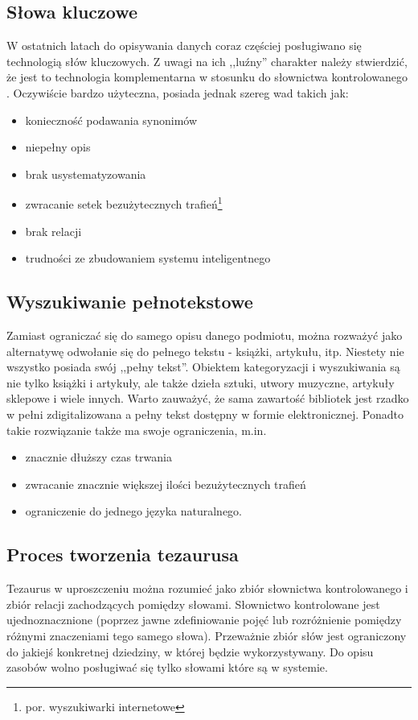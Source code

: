 \documentclass[12pt,a4paper,notitlepage]{article}
\begin{document}
\subsection{Słowa kluczowe}
W ostatnich latach do opisywania danych coraz częściej posługiwano się technologią słów kluczowych. Z uwagi na ich ,,luźny'' charakter należy stwierdzić, że jest to technologia komplementarna w stosunku do słownictwa kontrolowanego \cite{KasperekKonf}. Oczywiście bardzo użyteczna, posiada jednak szereg wad takich jak:
\begin{itemize}
   \item konieczność podawania synonimów
	\item niepełny opis
	\item brak usystematyzowania
	\item zwracanie setek bezużytecznych trafień\footnote{por. wyszukiwarki internetowe}
	\item brak relacji
	\item trudności ze zbudowaniem systemu inteligentnego
\end{itemize}    

\subsection{Wyszukiwanie pełnotekstowe}
Zamiast ograniczać się do samego opisu danego podmiotu, można rozważyć jako alternatywę odwołanie się do pełnego tekstu - książki, artykułu, itp. Niestety nie wszystko posiada swój ,,pełny tekst''. Obiektem kategoryzacji i wyszukiwania są nie tylko książki i artykuły, ale także dzieła sztuki, utwory muzyczne, artykuły sklepowe i wiele innych. Warto zauważyć, że sama zawartość bibliotek jest rzadko w pełni zdigitalizowana a pełny tekst dostępny w formie elektronicznej. Ponadto takie rozwiązanie także ma swoje ograniczenia, m.in.
 \begin{itemize}
   \item znacznie dłuższy czas trwania
	\item zwracanie znacznie większej ilości bezużytecznych trafień
	\item ograniczenie do jednego języka naturalnego.
\end{itemize}

\subsection{Proces tworzenia tezaurusa}
Tezaurus w uproszczeniu można rozumieć jako zbiór słownictwa kontrolowanego i zbiór relacji zachodzących pomiędzy słowami.
Słownictwo kontrolowane jest ujednoznacznione (poprzez jawne zdefiniowanie pojęć lub rozróżnienie pomiędzy różnymi znaczeniami tego samego słowa). Przeważnie zbiór słów jest ograniczony do jakiejś konkretnej dziedziny, w której będzie wykorzystywany. Do opisu zasobów wolno posługiwać się tylko słowami które są w systemie. 
\end{document}
